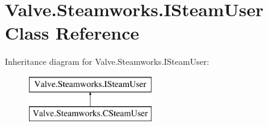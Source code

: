 \hypertarget{classValve_1_1Steamworks_1_1ISteamUser}{}\section{Valve.\+Steamworks.\+I\+Steam\+User Class Reference}
\label{classValve_1_1Steamworks_1_1ISteamUser}
Inheritance diagram for Valve.\+Steamworks.\+I\+Steam\+User\+:\begin{figure}[H]
\begin{center}
\leavevmode
\includegraphics[height=2.000000cm]{classValve_1_1Steamworks_1_1ISteamUser}
\end{center}
\end{figure}
